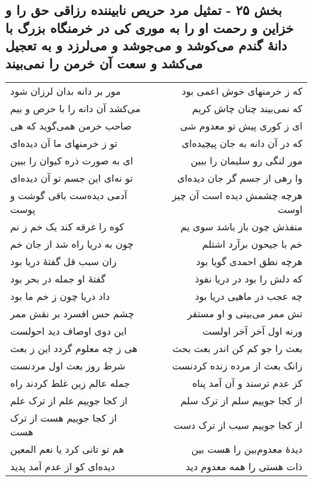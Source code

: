 \begin{center}
\section*{بخش ۲۵ - تمثیل مرد حریص نابیننده رزاقی حق را و خزاین و رحمت او را به موری کی در خرمنگاه بزرگ با دانهٔ گندم می‌کوشد و می‌جوشد و می‌لرزد و به تعجیل می‌کشد و سعت آن خرمن را نمی‌بیند}
\label{sec:sh025}
\begin{longtable}{l p{0.5cm} r}
مور بر دانه بدان لرزان شود
&&
که ز خرمنهای خوش اعمی بود
\\
می‌کشد آن دانه را با حرص و بیم
&&
که نمی‌بیند چنان چاش کریم
\\
صاحب خرمن همی‌گوید که هی
&&
ای ز کوری پیش تو معدوم شی
\\
تو ز خرمنهای ما آن دیده‌ای
&&
که در آن دانه به جان پیچیده‌ای
\\
ای به صورت ذره کیوان را ببین
&&
مور لنگی رو سلیمان را ببین
\\
تو نه‌ای این جسم تو آن دیده‌ای
&&
وا رهی از جسم گر جان دیده‌ای
\\
آدمی دیده‌ست باقی گوشت و پوست
&&
هرچه چشمش دیده است آن چیز اوست
\\
کوه را غرقه کند یک خم ز نم
&&
منفذش چون باز باشد سوی یم
\\
چون به دریا راه شد از جان خم
&&
خم با جیحون برآرد اشتلم
\\
زان سبب قل گفتهٔ دریا بود
&&
هرچه نطق احمدی گویا بود
\\
گفتهٔ او جمله در بحر بود
&&
که دلش را بود در دریا نفوذ
\\
داد دریا چون ز خم ما بود
&&
چه عجب در ماهیی دریا بود
\\
چشم حس افسرد بر نقش ممر
&&
تش ممر می‌بینی و او مستقر
\\
این دوی اوصاف دید احولست
&&
ورنه اول آخر آخر اولست
\\
هی ز چه معلوم گردد این ز بعث
&&
بعث را جو کم کن اندر بعث بحث
\\
شرط روز بعث اول مردنست
&&
زانک بعث از مرده زنده کردنست
\\
جمله عالم زین غلط کردند راه
&&
کز عدم ترسند و آن آمد پناه
\\
از کجا جوییم علم از ترک علم
&&
از کجا جوییم سلم از ترک سلم
\\
از کجا جوییم هست از ترک هست
&&
از کجا جوییم سیب از ترک دست
\\
هم تو تانی کرد یا نعم المعین
&&
دیدهٔ معدوم‌بین را هست بین
\\
دیده‌ای کو از عدم آمد پدید
&&
ذات هستی را همه معدوم دید

\end{longtable}
\end{center}
